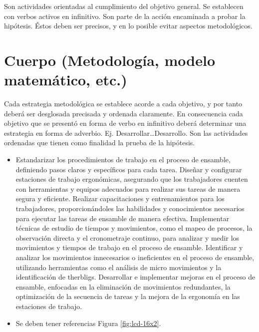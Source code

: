     Son actividades orientadas al cumplimiento del objetivo general. Se establecen con verbos activos en infinitivo. Son parte de la acción encaminada a probar la hipótesis. Éstos deben ser precisos, y en lo posible evitar aspectos metodológicos.
    \section{Cuerpo (Metodología, modelo matemático, etc.)}
    
    Cada estrategia metodológica se establece acorde a cada objetivo, y por tanto deberá ser desglosada precisada y ordenada claramente. En consecuencia cada objetivo que se presentó en forma de verbo en infinitivo deberá determinar una estrategia en forma de adverbio. Ej. Desarrollar…Desarrollo. Son las actividades ordenadas que tienen como finalidad la prueba de la hipótesis. 
    
    \begin{itemize}
        \item Estandarizar los procedimientos de trabajo en el proceso de ensamble, definiendo pasos claros y específicos para cada tarea.
    Diseñar y configurar estaciones de trabajo ergonómicas, asegurando que los trabajadores cuenten con herramientas y equipos adecuados para realizar sus tareas de manera segura y eficiente.
    Realizar capacitaciones y entrenamientos para los trabajadores, proporcionándoles las habilidades y conocimientos necesarios para ejecutar las tareas de ensamble de manera efectiva.
    Implementar técnicas de estudio de tiempos y movimientos, como el mapeo de procesos, la observación directa y el cronometraje continuo, para analizar y medir los movimientos y tiempos de trabajo en el proceso de ensamble.
    Identificar y analizar los movimientos innecesarios o ineficientes en el proceso de ensamble, utilizando herramientas como el análisis de micro movimientos y la identificación de therbligs.
    Desarrollar e implementar mejoras en el proceso de ensamble, enfocadas en la eliminación de movimientos redundantes, la optimización de la secuencia de tareas y la mejora de la ergonomía en las estaciones de trabajo.
        \item Se deben tener referencias Figura \ref{fig:lcd-16x2}.
    \end{itemize}
    
             
